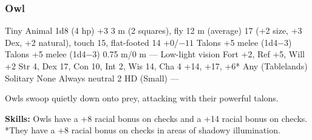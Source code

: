 \subsubsection{Owl}
\begin{MonsterStats}
{Tiny Animal}
{1d8 (4 hp)}
{+3}
{3 m (2 squares), fly 12 m (average)}
{17 (+2 size, +3 Dex, +2 natural), touch 15, flat-footed 14}
{+0/$-11$}
{Talons +5 melee (1d4$-3$)}
{Talons +5 melee (1d4$-3$)}
{0.75 m/0 m}
{---}
{Low-light vision}
{Fort +2, Ref +5, Will +2}
{Str 4, Dex 17, Con 10, Int 2, Wis 14, Cha 4}
{ +14,  +17,  +6*}
{}
{Any (Tablelands)}
{Solitary}
{\onequarter}
{None}
{Always neutral}
{2 HD (Small)}
{---}
\end{MonsterStats}


Owls swoop quietly down onto prey, attacking with their powerful talons.

\textbf{Skills:} Owls have a +8 racial bonus on  checks and a +14 racial bonus on  checks. *They have a +8 racial bonus on  checks in areas of shadowy illumination.
